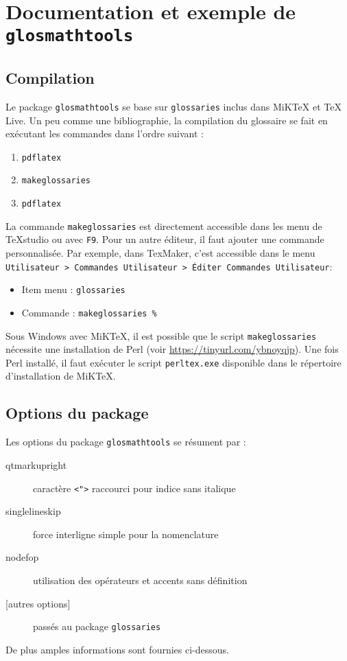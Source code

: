 \documentclass[projet,nohyperref,english,french]{ulthese}
\begin{document}
\frontmatter  
           
\frontispice
\printglossary[title=Nomenclature]

\mainmatter                     

\chapter{Documentation et exemple de \texttt{glosmathtools}}

\section{Compilation}
Le package \texttt{glosmathtools} se base sur \texttt{glossaries} inclus dans MiKTeX et TeX Live. Un peu comme une bibliographie, la compilation du glossaire se fait en exécutant les commandes dans l'ordre suivant :
\begin{enumerate}
	\item \texttt{pdflatex}
	\item \texttt{makeglossaries}
	\item \texttt{pdflatex}
\end{enumerate}
La commande \texttt{makeglossaries} est directement accessible dans les menu de TeXstudio ou avec \texttt{F9}. Pour un autre éditeur, il faut ajouter une commande personnalisée. Par exemple, dans TexMaker, c’est accessible dans le menu \texttt{Utilisateur > Commandes Utilisateur > Éditer Commandes Utilisateur}:
\begin{itemize}
	\item Item menu : \texttt{glossaries} 
	\item Commande : \texttt{makeglossaries \%}
\end{itemize}
Sous Windows avec MiKTeX, il est possible que le script \texttt{makeglossaries} nécessite une installation de Perl (voir \url{https://tinyurl.com/ybnoyqjp}). Une fois Perl installé, il faut exécuter le script \texttt{perltex.exe} disponible dans le répertoire d'installation de MiKTeX.

\section{Options du package}
Les options du package \texttt{glosmathtools} se résument par :
\begin{description}
	\item[qtmarkupright] caractère \texttt{<">} raccourci pour indice sans italique
	\item[singlelineskip] force interligne simple pour la nomenclature
	\item[nodefop] utilisation des opérateurs et accents sans définition
	\item[{[autres options]}] passés au package \texttt{glossaries}
\end{description}
De plus amples informations sont fournies ci-dessous.
\end{document}
